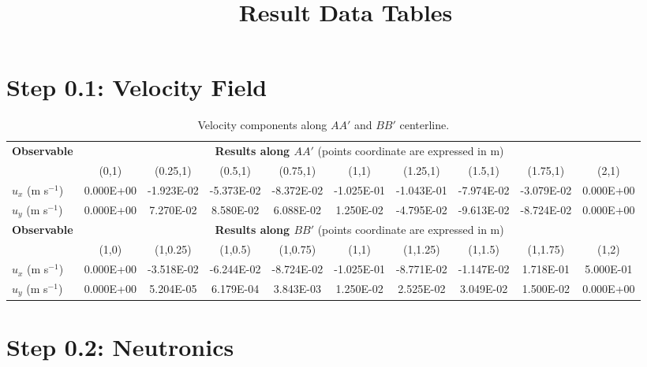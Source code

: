\documentclass[letterpaper,11pt]{article}
\begin{document}
%
\title{Result Data Tables}
\author{}
\date{}
%
\maketitle
%
\section*{Step 0.1: Velocity Field}

\begin{table}[htb!]
	\caption{Velocity components along $AA'$ and $BB'$ centerline.}
	\centering
	\footnotesize
	\setlength\tabcolsep{1.5pt}
	\begin{tabular}{l c c c c c c c c c}
		\toprule
		\multirow{2}{*}{\textbf{Observable}} & \multicolumn{9}{c}{\textbf{Results along $AA'$} (points coordinate are expressed in m)} \\
		& {(0,1)} & {(0.25,1)} & {(0.5,1)} & {(0.75,1)} & {(1,1)} & {(1.25,1)} & {(1.5,1)} & {(1.75,1)} & {(2,1)} \\
		\midrule
		$u_x$ (m s$^{-1}$) & 0.000E+00 & -1.923E-02 & -5.373E-02 & -8.372E-02 & -1.025E-01 & -1.043E-01 & -7.974E-02 & -3.079E-02 & 0.000E+00 \\
		$u_y$ (m s$^{-1}$) & 0.000E+00 & 7.270E-02 & 8.580E-02 & 6.088E-02 & 1.250E-02 & -4.795E-02 & -9.613E-02 & -8.724E-02 & 0.000E+00\\
		\midrule
		\midrule
		\multirow{2}{*}{\textbf{Observable}} & \multicolumn{9}{c}{\textbf{Results along $BB'$} (points coordinate are expressed in m)} \\
		& {(1,0)} & {(1,0.25)} & {(1,0.5)} & {(1,0.75)} & {(1,1)} & {(1,1.25)} & {(1,1.5)} & {(1,1.75)} & {(1,2)} \\
		\midrule
		$u_x$ (m s$^{-1}$) & 0.000E+00 & -3.518E-02 & -6.244E-02 & -8.724E-02 & -1.025E-01 & -8.771E-02 & -1.147E-02 & 1.718E-01 & 5.000E-01 \\
		$u_y$ (m s$^{-1}$) & 0.000E+00 & 5.204E-05 & 6.179E-04 & 3.843E-03 & 1.250E-02 & 2.525E-02 & 3.049E-02 & 1.500E-02 & 0.000E+00\\
		\bottomrule
	\end{tabular}
\end{table}

\section*{Step 0.2: Neutronics}
\end{document}
